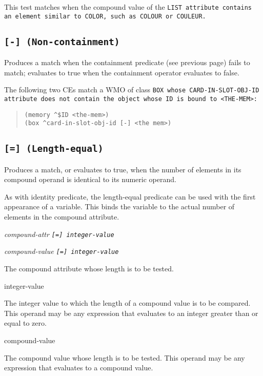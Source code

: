 This test matches when the compound value of the \ct\tt{LIST}
attribute contains an element similar to \tt{COLOR}, such as
\tt{COLOUR} or \tt{COULEUR}.

\subsection{\tt{[-]} (Non-containment)}

Produces a match when the containment predicate (see previous
page) fails to match; evaluates to true when the containment
operator evaluates to false.

\Example

The following two CEs match a WMO of class \tt{BOX} whose
\ct\tt{CARD-IN-SLOT-OBJ-ID} attribute does not contain the object
whose ID is bound to \tt{<THE-MEM>}:

\begin{quote}
\begin{verbatim}
(memory ^$ID <the-mem>)
(box ^card-in-slot-obj-id [-] <the mem>)
\end{verbatim}
\end{quote}

\subsection{\tt{[=]} (Length-equal)}

Produces a match, or evaluates to true, when the number of elements in
its compound operand is identical to its numeric operand.

As with identity predicate, the length-equal predicate can be used
with the first appearance of a variable. This binds the variable to
the actual number of elements in the compound attribute.

\Format

\ct\it{compound-attr} \tt{[=]} \it{integer-value}

\it{compound-value} \tt{[=]} \it{integer-value}

\begin{operands}
\item[\ct{compound-attr}]

  The compound attribute whose length is to be tested.

\item[integer-value]

  The integer value to which the length of a compound value is to be
  compared. This operand may be any expression that evaluates to an
  integer greater than or equal to zero.

\item[compound-value]

  The compound value whose length is to be tested. This operand may be
  any expression that evaluates to a compound value.
\end{operands}

